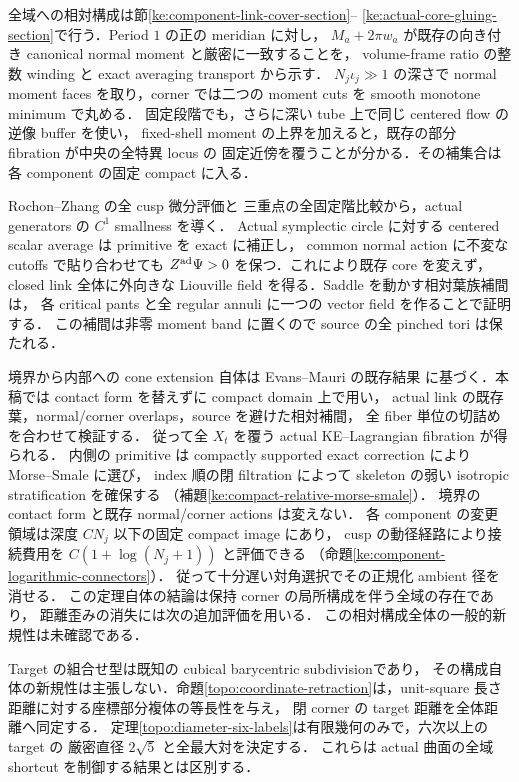 全域への相対構成は節\ref{ke:component-link-cover-section}--
\ref{ke:actual-core-gluing-section}で行う．Period $1$ の正の meridian に対し，
$M_a+2\pi w_a$ が既存の向き付き canonical normal moment と厳密に一致することを，
volume-frame ratio の整数 winding と exact averaging transport から示す．
$N_j\iota_j\gg1$ の深さで normal moment faces を取り，corner では二つの
moment cuts を smooth monotone minimum で丸める．
固定段階でも，さらに深い tube 上で同じ centered flow の逆像 buffer を使い，
fixed-shell moment の上界を加えると，既存の部分 fibration が中央の全特異 locus の
固定近傍を覆うことが分かる．その補集合は各 component の固定 compact に入る．

Rochon--Zhang の全 cusp 微分評価\cite[\S5, (5.3)--(5.6)]{RochonZhang}と
三重点の全固定階比較から，actual generators の $C^1$ smallness を導く．
Actual symplectic circle に対する centered scalar average は primitive を exact に補正し，
common normal action に不変な cutoffs で貼り合わせても
$Z^{\rm ad}\Psi>0$ を保つ．これにより既存 core を変えず，closed link 全体に外向きな
Liouville field を得る．Saddle を動かす相対葉族補間は，
各 critical pants と全 regular annuli に一つの vector field を作ることで証明する．
この補間は非零 moment band に置くので source の全 pinched tori は保たれる．

境界から内部への cone extension 自体は Evans--Mauri の既存結果
\cite[Lemma~2.16]{EM}に基づく．本稿では contact form を替えずに compact domain 上で用い，
actual link の既存葉，normal/corner overlaps，source を避けた相対補間，
全 fiber 単位の切詰めを合わせて検証する．
従って全 $X_t$ を覆う actual KE--Lagrangian fibration が得られる．
内側の primitive は compactly supported exact correction により Morse--Smale に選び，
index 順の閉 filtration によって skeleton の弱い isotropic stratification を確保する
（補題\ref{ke:compact-relative-morse-smale}）．
境界の contact form と既存 normal/corner actions は変えない．
各 component の変更領域は深度 $CN_j$ 以下の固定 compact image にあり，
cusp の動径経路により接続費用を $C(1+\log(N_j+1))$ と評価できる
（命題\ref{ke:component-logarithmic-connectors}）．
従って十分遅い対角選択でその正規化 ambient 径を消せる．
この定理自体の結論は保持 corner の局所構成を伴う全域の存在であり，
距離歪みの消失には次の追加評価を用いる．
この相対構成全体の一般的新規性は未確認である．

Target の組合せ型は既知の cubical barycentric subdivision\cite{BabsonBilleraChan}であり，
その構成自体の新規性は主張しない．命題\ref{topo:coordinate-retraction}は，unit-square 長さ距離に対する座標部分複体の等長性を与え，
閉 corner の target 距離を全体距離へ同定する．
定理\ref{topo:diameter-six-labels}は有限幾何のみで，六次以上の target の
厳密直径 $2\sqrt5$ と全最大対を決定する．
これらは actual 曲面の全域 shortcut を制御する結果とは区別する．

